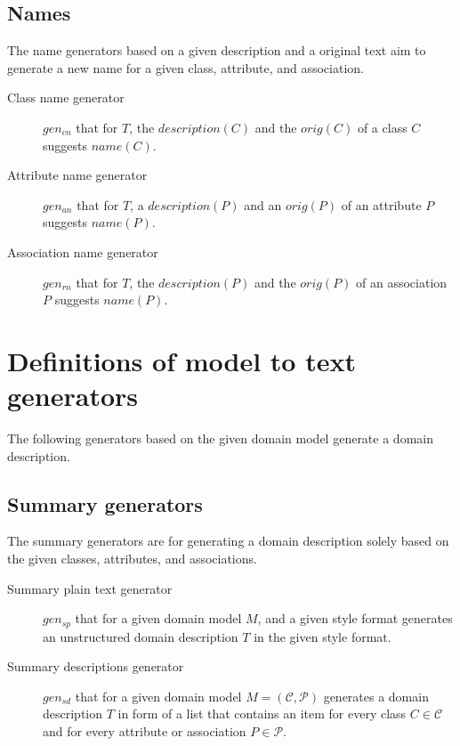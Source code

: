 \subsection{Names}

The name generators based on a given description and a original text aim to generate a new name for a given class, attribute, and association.

\begin{description}
\item [Class name generator] $gen_{cn}$ that for $T$, the $description(C)$ and the $orig(C)$ of a class $C$ suggests  $name(C)$.

\item [Attribute name generator] $gen_{an}$ that for $T$,  a $description(P)$ and an $orig(P)$ of an attribute $P$ suggests $name(P)$.

\item [Association name generator] $gen_{rn}$ that for $T$, the $description(P)$ and the $orig(P)$ of an association $P$ suggests $name(P)$.
\end{description}


\section{Definitions of model to text generators}

The following generators based on the given domain model generate a domain description.

\subsection{Summary generators}

The summary generators are for generating a domain description solely based on the given classes, attributes, and associations.

\begin{description}
\item [Summary plain text generator] $gen_{sp}$ that for a given domain model $M$, and a given style format generates an unstructured domain description $T$ in the given style format.

\item [Summary descriptions generator] $gen_{sd}$ that for a given domain model $M = (\mathcal{C}, \mathcal{P})$ generates a domain description $T$ in form of a list that contains an item for every class $C \in \mathcal{C}$ and for every attribute or association $P \in\mathcal{P}$.
\end{description}


